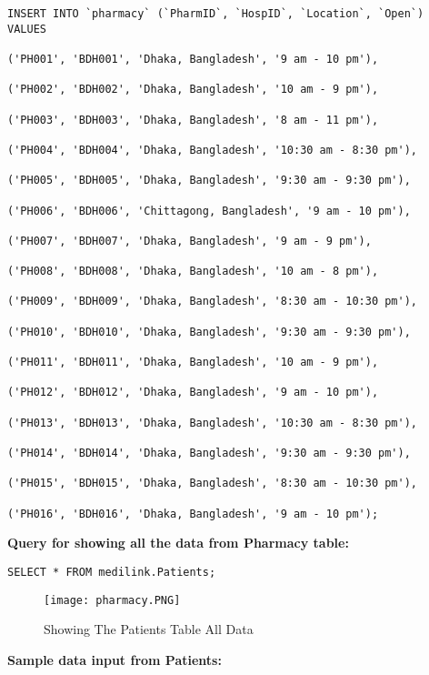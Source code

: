 \documentclass[11pt]{article}
\begin{document}
\begin{lstlisting}
INSERT INTO `pharmacy` (`PharmID`, `HospID`, `Location`, `Open`)
VALUES

('PH001', 'BDH001', 'Dhaka, Bangladesh', '9 am - 10 pm'),

('PH002', 'BDH002', 'Dhaka, Bangladesh', '10 am - 9 pm'),

('PH003', 'BDH003', 'Dhaka, Bangladesh', '8 am - 11 pm'),

('PH004', 'BDH004', 'Dhaka, Bangladesh', '10:30 am - 8:30 pm'),

('PH005', 'BDH005', 'Dhaka, Bangladesh', '9:30 am - 9:30 pm'),

('PH006', 'BDH006', 'Chittagong, Bangladesh', '9 am - 10 pm'),

('PH007', 'BDH007', 'Dhaka, Bangladesh', '9 am - 9 pm'),

('PH008', 'BDH008', 'Dhaka, Bangladesh', '10 am - 8 pm'),

('PH009', 'BDH009', 'Dhaka, Bangladesh', '8:30 am - 10:30 pm'),

('PH010', 'BDH010', 'Dhaka, Bangladesh', '9:30 am - 9:30 pm'),

('PH011', 'BDH011', 'Dhaka, Bangladesh', '10 am - 9 pm'),

('PH012', 'BDH012', 'Dhaka, Bangladesh', '9 am - 10 pm'),

('PH013', 'BDH013', 'Dhaka, Bangladesh', '10:30 am - 8:30 pm'),

('PH014', 'BDH014', 'Dhaka, Bangladesh', '9:30 am - 9:30 pm'),

('PH015', 'BDH015', 'Dhaka, Bangladesh', '8:30 am - 10:30 pm'),

('PH016', 'BDH016', 'Dhaka, Bangladesh', '9 am - 10 pm');

\end{lstlisting}

\textbf{Query for showing all the data from Pharmacy table: }
\begin{lstlisting}
SELECT * FROM medilink.Patients;
\end{lstlisting}
\begin{figure}[H]
    \centering
    \texttt{[image: pharmacy.PNG]}
    \caption{Showing The Patients Table All Data}
    \label{fig:1}
\end{figure}


\textbf{Sample data input from Patients:}
\end{document}
